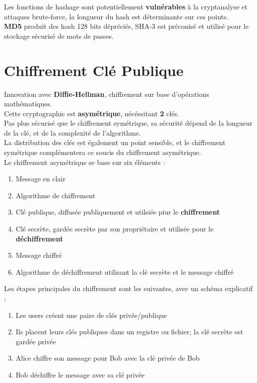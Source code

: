 \documentclass{report}
\begin{document}
				Les fonctions de hashage sont potentiellement \textbf{vulnérables} à la cryptanalyse et attaques brute-force, la longueur du hash est déterminante sur ces points.\\

				\textbf{MD5} produit des hash 128 bits dépréciés, SHA-3 est préconisé et utilisé pour le stockage sécurisé de mots de passes.\\

 
	\section{Chiffrement Clé Publique}

		Innovation avec \textbf{Diffie-Hellman}, chiffrement sur base d'opérations mathématiques.\\
		Cette cryptographie est \textbf{asymétrique}, nécéssitant \textbf{2} clés.\\

		Pas plus sécurisé que le chiffrement symétrique, sa sécurité dépend de la longueur de la clé, et de la complexité de l'algorithme.\\
		La distribution des clés est également un point sensible, et le chiffrement symétrique complémentera ce soucis du chiffrement asymétrique.\\

		Le chiffrement asymétrique se base sur six éléments : \\

		\begin{enumerate}
			\item Message en clair
			\item Algorithme de chiffrement
			\item Clé publique, diffusée publiquement et utilsiée piur le \textbf{chiffrement}
			\item Clé secrète, gardée secrète par son propriétaire et utilisée pour le \textbf{déchiffrement}
			\item Message chiffré 
			\item Algorithme de déchiffrement utilisant la clé secrète et le message chiffré\\
		\end{enumerate}

		Les étapes principales du chiffrement sont les suivantes, avec un schéma explicatif : \\

		\begin{enumerate}
			\item Les users créent une paire de clés privée/publique
			\item Ils placent leurs clés publiques dans un registre ou fichier; la clé secrète est gardée privée
			\item Alice chiffre son message pour Bob avec la clé privée de Bob
			\item Bob déchiffre le message avec sa clé privée\\
		\end{enumerate}
\end{document}
